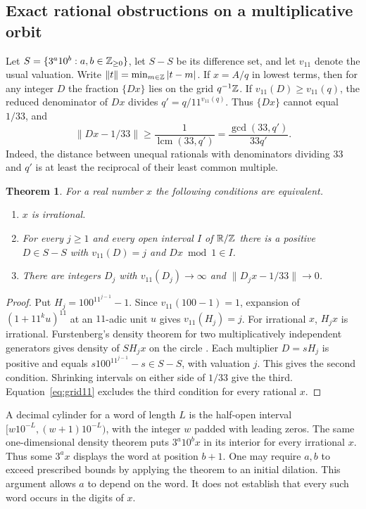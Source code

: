 \documentclass[11pt,a4paper]{article}
\newtheorem{theorem}{Theorem}[section]
\theoremstyle{definition}\newtheorem{definition}[theorem]{Definition}\newtheorem{example}[theorem]{Example}
\theoremstyle{remark}\newtheorem{remark}[theorem]{Remark}
\begin{document}
\subsection{Exact rational obstructions on a multiplicative orbit}
Let $S=\{3^a10^b:a,b\in\mathbb Z_{\ge0}\}$, let $S-S$ be its difference set,
and let $v_{11}$ denote the usual valuation. Write $\|t\|=\min_{m\in\mathbb Z}|t-m|$.
If $x=A/q$ in lowest terms, then for any integer $D$ the fraction $\{Dx\}$
lies on the grid $q^{-1}\mathbb Z$. If $v_{11}(D)\ge v_{11}(q)$, the reduced
denominator of $Dx$ divides $q'=q/11^{v_{11}(q)}$. Thus $\{Dx\}$ cannot
equal $1/33$, and
\begin{equation}\label{eq:grid11}
 \|Dx-1/33\|\ge \frac{1}{\operatorname{lcm}(33,q')}
 =\frac{\gcd(33,q')}{33q'}.
\end{equation}
Indeed, the distance between unequal rationals with denominators dividing
$33$ and $q'$ is at least the reciprocal of their least common multiple.

\begin{theorem}\label{thm:circle-target}
For a real number $x$ the following conditions are equivalent.
\begin{enumerate}
\item $x$ is irrational.
\item For every $j\ge1$ and every open interval $I$ of $\mathbb R/\mathbb Z$ there is a
positive $D\in S-S$ with $v_{11}(D)=j$ and $Dx\bmod1\in I$.
\item There are integers $D_j$ with $v_{11}(D_j)\to\infty$ and
$\|D_jx-1/33\|\to0$.
\end{enumerate}
\end{theorem}
\begin{proof}
Put $H_j=100^{11^{j-1}}-1$. Since $v_{11}(100-1)=1$, expansion of
$(1+11^ku)^{11}$ at an $11$-adic unit $u$ gives $v_{11}(H_j)=j$.
For irrational $x$, $H_jx$ is irrational. Furstenberg's density theorem for
two multiplicatively independent generators gives density of $S H_jx$ on the
circle \cite{Furstenberg}. Each multiplier $D=sH_j$ is positive and equals
$s100^{11^{j-1}}-s\in S-S$, with valuation $j$. This gives the second
condition. Shrinking intervals on either side of $1/33$ give the third.
Equation~\eqref{eq:grid11} excludes the third condition for every rational $x$.
\end{proof}

A decimal cylinder for a word of length $L$ is the half-open interval
$[w10^{-L},(w+1)10^{-L})$, with the integer $w$ padded with leading zeros.
The same one-dimensional density theorem puts $3^a10^b x$ in its interior
for every irrational $x$. Thus some $3^a x$ displays the word at position
$b+1$. One may require $a,b$ to exceed prescribed bounds by applying the
theorem to an initial dilation. This argument allows $a$ to depend on the word.
It does not establish that every such word occurs in the digits of $x$.
\end{document}
